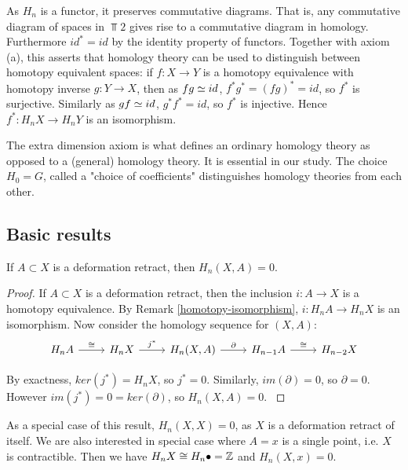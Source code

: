 \begin{remark}\label{homotopy-isomorphism}
As $H_n$ is a functor, it preserves commutative diagrams. That is, any commutative diagram of spaces in $\Top{2}$ gives rise to a commutative diagram in homology. Furthermore $id^*=id$ by the identity property of functors. Together with axiom (a), this asserts that homology theory can be used to distinguish between homotopy equivalent spaces: if $f:X\rightarrow Y$ is a homotopy equivalence with homotopy inverse $g:Y\rightarrow X$, then as $fg\simeq id$, $f^*g^*=(fg)^*=id$, so $f^*$ is surjective. Similarly as $gf\simeq id$, $g^*f^*=id$, so $f^*$ is injective. Hence $f^*:H_nX\rightarrow H_nY$ is an isomorphism.
\end{remark}
The extra dimension axiom is what defines an ordinary homology theory as opposed to a (general) homology theory. It is essential in our study. The choice $H_0=G$, called a "choice of coefficients" distinguishes homology theories from each other.

\subsection{Basic results}
\begin{prop}
If $A\subset X$ is a deformation retract, then $H_n(X,A)=0$.
\end{prop}
\begin{proof}
If $A\subset X$ is a deformation retract, then the inclusion $i:A\rightarrow X$ is a homotopy equivalence. By Remark \ref{homotopy-isomorphism}, $i:H_nA\rightarrow H_nX$ is an isomorphism. Now consider the homology sequence for $(X,A)$:
\[\begin{tikzcd}
H_nA \arrow[r, "\iso"] & H_nX \arrow[r, "j^*"] & {H_n(X,A)} \arrow[r, "\partial"] & H_{n-1}A \arrow[r, "\iso"] & H_{n-2}X
\end{tikzcd}\]

By exactness, $ker(j^*)=H_nX$, so $j^*=0$. Similarly, $im(\partial)=0$, so $\partial=0$. However $im(j^*)=0=ker(\partial)$, so $H_n(X,A)=0$. \cite{Werndli}
\end{proof}

\begin{remark}
\label{contractible-0}
As a special case of this result, $H_n(X,X)=0$, as $X$ is a deformation retract of itself. We are also interested in special case where $A=x$ is a single point, i.e. $X$ is contractible. Then we have $H_nX\cong H_n\bullet=\mathbb{Z}$ and $H_n(X,x)=0$.
\end{remark}

